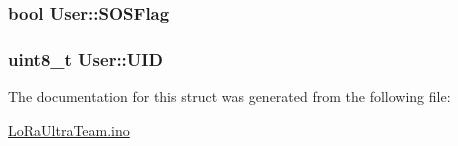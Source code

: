 \subsubsection[{\texorpdfstring{S\+O\+S\+Flag}{SOSFlag}}]{\setlength{\rightskip}{0pt plus 5cm}bool User\+::\+S\+O\+S\+Flag}\hypertarget{struct_user_a4047dfbd01104d59e949f43695b191c8}{}\label{struct_user_a4047dfbd01104d59e949f43695b191c8}
\subsubsection[{\texorpdfstring{U\+ID}{UID}}]{\setlength{\rightskip}{0pt plus 5cm}uint8\+\_\+t User\+::\+U\+ID}\hypertarget{struct_user_ab95507be7717a9c2ba7023d1473b57db}{}\label{struct_user_ab95507be7717a9c2ba7023d1473b57db}


The documentation for this struct was generated from the following file\+:\begin{DoxyCompactItemize}
\item 
\hyperlink{_lo_ra_ultra_team_8ino}{Lo\+Ra\+Ultra\+Team.\+ino}\end{DoxyCompactItemize}
